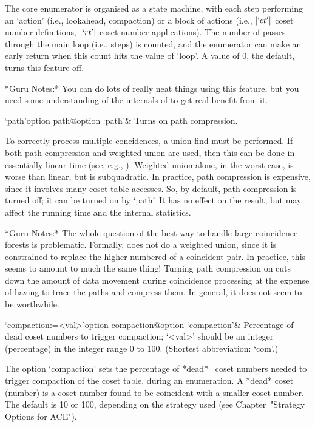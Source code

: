The core enumerator is organised as a state machine,  with  each  step
performing an \lq{}action' (i.e., lookahead, compaction) or a block of
actions (i.e.,  $|`ct'|$  coset  number  definitions,  $|`rt'|$  coset
number applications). The number  of  passes  through  the  main  loop
(i.e., steps) is counted, and the enumerator can make an early  return
when this count hits the value of `loop'. A value of $0$, the default,
turns this feature off.

*Guru Notes:*
You can do lots of really neat things using this feature, but you need
some understanding of the internals of {\ACE} to get real benefit from
it.

\>`path'{option path}@{option `path'}&
Turns on path compression.

To correctly  process  multiple  concidences,  a  union-find  must  be
performed. If both path compression and weighted union are used,  then
this can be done in essentially linear time (see, e.g., \cite{CLR90}).
Weighted union alone, in the worst-case, is worse than linear, but  is
subquadratic. In practice, path compression  is  expensive,  since  it
involves many coset table accesses. So, by default,  path  compression
is turned off; it can be turned on by `path'. It has no effect on  the
result, but may affect the running time and the internal statistics.

*Guru Notes:*
The whole question of the best way to handle large coincidence forests
is problematic.  Formally, {\ACE} does  not do a weighted union, since
it is constrained to replace the higher-numbered of a coincident pair.
In practice,  this seems  to amount to  much the same  thing!  Turning
path  compression on  cuts down  the  amount of  data movement  during
coincidence processing at the expense of having to trace the paths and
compress them.  In general, it does not seem to be worthwhile.

\>`compaction:=<val>'{option compaction}@{option `compaction'}&
Percentage of dead coset numbers to trigger
compaction; `<val>' should be an integer (percentage) in  the  integer
range 0 to 100. (Shortest abbreviation: `com'.)

The option `compaction'  sets  the  percentage  of  *dead*~ coset numbers needed  to  trigger  compaction  of  the
coset table, during an enumeration. A *dead* coset (number) is a coset
number found to be coincident with a smaller coset number.  The
default  is  10  or  100,  depending  on  the   strategy   used   (see
Chapter~"Strategy Options for ACE").

